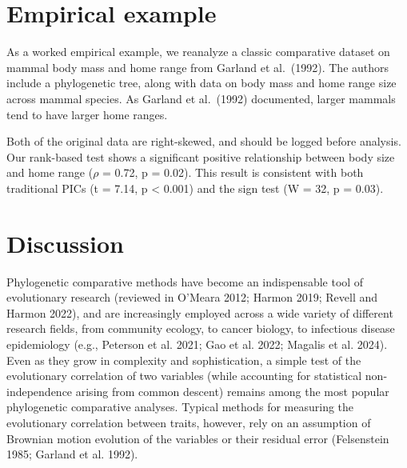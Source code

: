\documentclass[fleqn,10pt,lineno]{wlpeerj} %
\begin{document}
\section{Empirical example}\label{empirical-example}

As a worked empirical example, we reanalyze a classic comparative dataset on mammal body mass and home range from Garland et al.~(1992). The authors include a phylogenetic tree, along with data on body mass and home range size across mammal species. As Garland et al.~(1992) documented, larger mammals tend to have larger home ranges.

Both of the original data are right-skewed, and should be logged before analysis. Our rank-based test shows a significant positive relationship between body size and home range (\(\rho\) = 0.72, p = 0.02). This result is consistent with both traditional PICs (t = 7.14, p \textless{} 0.001) and the sign test (W = 32, p = 0.03).

\section{Discussion}\label{discussion}

Phylogenetic comparative methods have become an indispensable tool of evolutionary research (reviewed in O'Meara 2012; Harmon 2019; Revell and Harmon 2022), and are increasingly employed across a wide variety of different research fields, from community ecology, to cancer biology, to infectious disease epidemiology (e.g., Peterson et al. 2021; Gao et al. 2022; Magalis et al. 2024). Even as they grow in complexity and sophistication, a simple test of the evolutionary correlation of two variables (while accounting for statistical non-independence arising from common descent) remains among the most popular phylogenetic comparative analyses. Typical methods for measuring the evolutionary correlation between traits, however, rely on an assumption of Brownian motion evolution of the variables or their residual error (Felsenstein 1985; Garland et al. 1992).
\end{document}
